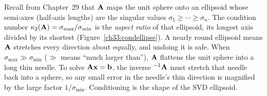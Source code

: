 \begin{connectionbox}
Recall from Chapter~29 that $\mathbf{A}$ maps the unit sphere onto an ellipsoid whose
semi-axes (half-axis lengths) are the singular values $\sigma_1\ge\cdots\ge\sigma_n$.
The condition number $\kappa_2(\mathbf{A}) = \sigma_{\max}/\sigma_{\min}$ is the
\emph{aspect ratio} of that ellipsoid, its longest axis divided by its shortest
(Figure~\ref{ch33:condellipse}). A nearly round ellipsoid means $\mathbf{A}$ stretches
every direction about equally, and undoing it is safe. When
$\sigma_{\max} \gg \sigma_{\min}$ ($\gg$ means ``much larger than''), $\mathbf{A}$
flattens the unit sphere into a long thin needle. To solve $\mathbf{A}\mathbf{x}=\mathbf{b}$, the
inverse $^{-1}{\mathbf{A}}$ must stretch that needle back into a sphere, so any small
error in the needle's thin direction is magnified by the large factor
$1/\sigma_{\min}$. Conditioning is the shape of the SVD ellipsoid.
\end{connectionbox}

